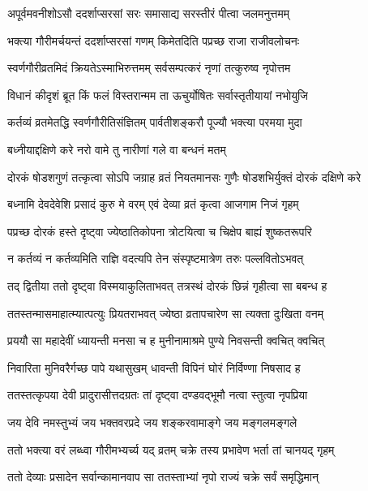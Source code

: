 \twolineshloka
{अपूर्वमवनीशोऽसौ ददर्शाप्सरसां सरः}
{समासाद्य सरस्तीरं पीत्वा जलमनुत्तमम्} %

\twolineshloka
{भक्त्या गौरीमर्चयन्तं ददर्शाप्सरसां गणम्}
{किमेतदिति पप्रच्छ राजा राजीवलोचनः} %

\twolineshloka
{स्वर्णगौरीव्रतमिदं क्रियतेऽस्माभिरुत्तमम्}
{सर्वसम्पत्करं नृणां तत्कुरुष्व नृपोत्तम} %


\twolineshloka
{विधानं कीदृशं ब्रूत किं फलं विस्तरान्मम}
{ता ऊचुर्योषितः सर्वास्तृतीयायां नभोयुजि} %

\twolineshloka
{कर्तव्यं व्रतमेतद्धि स्वर्णगौरीतिसंज्ञितम्}
{पार्वतीशङ्करौ पूज्यौ भक्त्या परमया मुदा} %

\twolineshloka
{बध्नीयाद्दक्षिणे करे}
{नरो वामे तु नारीणां गले वा बन्धनं मतम्} %

\twolineshloka
{दोरकं षोडशगुणं तत्कृत्वा सोऽपि जग्राह व्रतं नियतमानसः}
{गुणैः षोडशभिर्युक्तं दोरकं दक्षिणे करे} %

\twolineshloka
{बध्नामि देवदेवेशि प्रसादं कुरु मे वरम्}
{एवं देव्या व्रतं कृत्वा आजगाम निजं गृहम्} %

\twolineshloka
{पप्रच्छ दोरकं हस्ते दृष्ट्वा ज्येष्ठातिकोपना}
{त्रोटयित्वा च चिक्षेप बाह्यं शुष्कतरूपरि} %

\twolineshloka
{न कर्तव्यं न कर्तव्यमिति राज्ञि वदत्यपि}
{तेन संस्पृष्टमात्रेण तरुः पल्लवितोऽभवत्} %

\twolineshloka
{तद् द्वितीया ततो दृष्ट्वा विस्मयाकुलिताभवत्}
{तत्रस्थं दोरकं छिन्नं गृहीत्वा सा बबन्ध ह} %

\twolineshloka
{ततस्तन्मासमाहात्म्यात्पत्युः प्रियतराभवत्}
{ज्येष्ठा व्रतापचारेण सा त्यक्ता दुःखिता वनम्} %

\twolineshloka
{प्रययौ सा महादेवीं ध्यायन्ती मनसा च ह}
{मुनीनामाश्रमे पुण्ये निवसन्ती क्वचित् क्वचित्} %

\twolineshloka
{निवारिता मुनिवरैर्गच्छ पापे यथासुखम्}
{धावन्ती विपिनं घोरं निर्विण्णा निषसाद ह} %

\twolineshloka
{ततस्तत्कृपया देवी प्रादुरासीत्तदग्रतः}
{तां दृष्ट्वा दण्डवद्भूमौ नत्वा स्तुत्वा नृपप्रिया} %

\twolineshloka
{जय देवि नमस्तुभ्यं जय भक्तवरप्रदे}
{जय शङ्करवामाङ्गे जय मङ्गलमङ्गले} %

\twolineshloka
{ततो भक्त्या वरं लब्ध्वा गौरीमभ्यर्च्य यद् व्रतम्}
{चक्रे तस्य प्रभावेण भर्ता तां चानयद् गृहम्} %

\twolineshloka
{ततो देव्याः प्रसादेन सर्वान्कामानवाप सा}
{ततस्ताभ्यां नृपो राज्यं चक्रे सर्वं समृद्धिमान्} %

